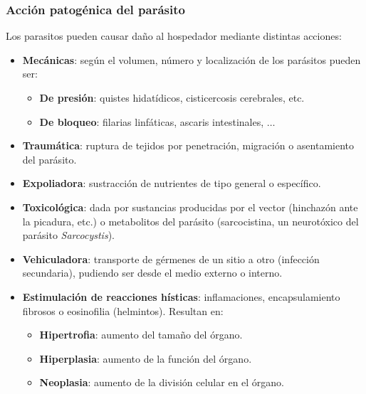 \documentclass[10pt,a4paper,onecolumn,openany]{book}
\begin{document}
\subsubsection{Acción patogénica del parásito}
Los parasitos pueden causar daño al hospedador mediante distintas acciones:
\begin{itemize}[itemsep=0pt,parsep=0pt,topsep=0pt,partopsep=0pt]
	\item \textbf{Mecánicas}: según el volumen, número y localización de los parásitos pueden ser:
	\begin{itemize}[itemsep=0pt,parsep=0pt,topsep=0pt,partopsep=0pt]
		\item\textbf{De presión}: quistes hidatídicos, cisticercosis cerebrales, etc.
		\item\textbf{De bloqueo}: filarias linfáticas, ascaris intestinales, $\dots$
	\end{itemize}
	\item\textbf{Traumática}: ruptura de tejidos por penetración, migración o asentamiento del parásito.
	\item\textbf{Expoliadora}: sustracción de nutrientes de tipo general o específico.
	\item\textbf{Toxicológica}: dada por sustancias producidas por el vector (hinchazón ante la picadura, etc.) o metabolitos del parásito (sarcocistina, un neurotóxico del parásito \textit{Sarcocystis}).
	\item\textbf{Vehiculadora}: transporte de gérmenes de un sitio a otro (infección secundaria), pudiendo ser desde el medio externo o interno.
	\item\textbf{Estimulación de reacciones hísticas}: inflamaciones, encapsulamiento fibrosos o eosinofilia (helmintos). Resultan en:
	\begin{itemize}[itemsep=0pt,parsep=0pt,topsep=0pt,partopsep=0pt]
		\item\textbf{Hipertrofia}: aumento del tamaño del órgano.
		\item\textbf{Hiperplasia}: aumento de la función del órgano.
		\item\textbf{Neoplasia}: aumento de la división celular en el órgano.
	\end{itemize}
\end{itemize}
\end{document}
